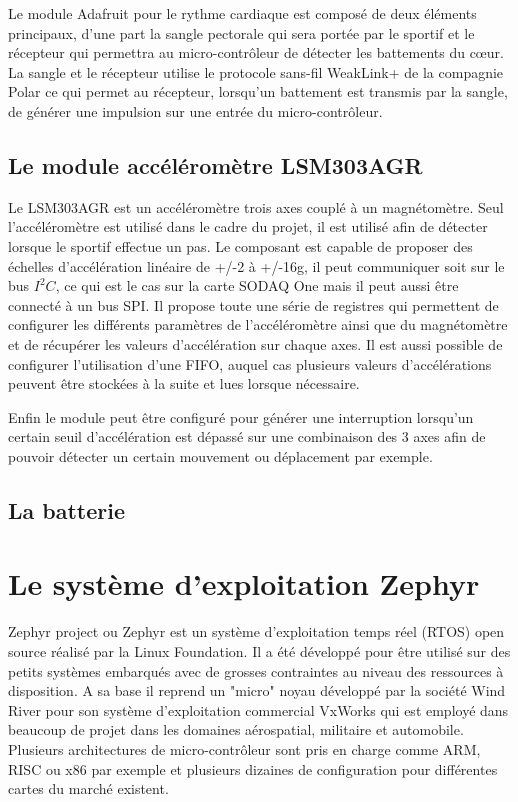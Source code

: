 Le module Adafruit pour le rythme cardiaque est composé de deux éléments principaux, d'une part la sangle pectorale qui sera portée par le sportif et le récepteur qui permettra au micro-contrôleur de détecter les battements du cœur. La sangle et le récepteur utilise le protocole sans-fil WeakLink+ de la compagnie Polar ce qui permet au récepteur, lorsqu'un battement est transmis par la sangle, de générer une impulsion sur une entrée du micro-contrôleur.


\subsection{Le module accéléromètre LSM303AGR}\label{ch:module_lsm303agr}


Le LSM303AGR est un accéléromètre trois axes couplé à un magnétomètre. Seul l'accéléromètre est utilisé dans le cadre du projet, il est utilisé afin de détecter lorsque le sportif effectue un pas. Le composant est capable de proposer des échelles d'accélération linéaire de +/-2 à +/-16g, il peut communiquer soit sur le bus $I^{2}C$, ce qui est le cas sur la carte SODAQ One mais il peut aussi être connecté à un bus SPI. Il propose toute une série de registres qui permettent de configurer les différents paramètres de l'accéléromètre ainsi que du magnétomètre et de récupérer les valeurs d'accélération sur chaque axes. Il est aussi possible de configurer l'utilisation d'une FIFO, auquel cas plusieurs valeurs d'accélérations peuvent être stockées à la suite et lues lorsque nécessaire.

Enfin le module peut être configuré pour générer une interruption lorsqu'un certain seuil d'accélération est dépassé sur une combinaison des 3 axes afin de pouvoir détecter un certain mouvement ou déplacement par exemple. 

\subsection{La batterie}

\todo{}

\section{Le système d'exploitation Zephyr}

Zephyr project ou Zephyr est un système d'exploitation temps réel (RTOS) open source réalisé par la Linux Foundation. Il a été développé pour être utilisé sur des petits systèmes embarqués avec de grosses contraintes au niveau des ressources à disposition. A sa base il reprend un "micro" noyau développé par la société Wind River pour son système d'exploitation commercial VxWorks qui est employé dans beaucoup de projet dans les domaines aérospatial, militaire et automobile.
Plusieurs architectures de micro-contrôleur sont pris en charge comme ARM, RISC ou x86 par exemple et plusieurs dizaines de configuration pour différentes cartes du marché existent. 

